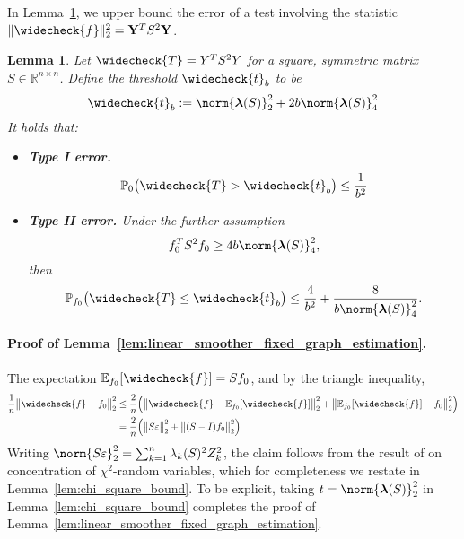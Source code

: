 \documentclass[twoside]{article}
\newcommand{\Reals}{\mathbb{R}}
\newcommand{\1}{\mathbf{1}}
\newcommand{\lambdavec}{\boldsymbol{\lambda}}
\newcommand{\Pbb}{\mathbb{P}}
\newcommand{\Ebb}{\mathbb{E}}
\newcommand{\wc}[1]{\widecheck{#1}}
\newtheorem{lemma}{Lemma}
\theoremstyle{definition}
\theoremstyle{remark}
\begin{document}
In Lemma~\ref{lem:linear_smoother_fixed_graph_testing}, we upper bound the error of a test involving the statistic $\|\wc{f}\|_2^2 = {\bf Y}^T S^2 {\bf Y}$.
\begin{lemma}
	\label{lem:linear_smoother_fixed_graph_testing}
	Let $\wc{T} = Y^T S^2 Y$ for a square, symmetric matrix $S \in \Reals^{n \times n}$. Define the threshold $\wc{t}_b$ to be 
	\begin{equation}
	\wc{t}_{b} := \norm{\lambdavec(S)}_2^2 + 2b \norm{\lambdavec(S)}_4^2
	\end{equation}
	It holds that:
	\begin{itemize}
		\item \textbf{Type I error.}
		\begin{equation}
		\label{eqn:linear_smoother_fixed_graph_testing_typeI}
		\Pbb_0\bigl(\wc{T} > \wc{t}_b\bigr) \leq \frac{1}{b^2}
		\end{equation}
		\item \textbf{Type II error.} Under the further assumption
		\begin{equation}
		\label{eqn:linear_smoother_fixed_graph_testing_critical_radius}
		f_0^T S^2 f_0 \geq 4b \norm{\lambdavec(S)}_4^2,
		\end{equation}
		then
		\begin{equation}
		\label{eqn:linear_smoother_fixed_graph_testing_typeII}
		\Pbb_{f_0}\bigl(\wc{T} \leq \wc{t}_b\bigr) \leq \frac{4}{b^2} + \frac{8}{b \norm{\lambdavec(S)}_4^{2}}.
		\end{equation}
	\end{itemize}
\end{lemma}

\paragraph{Proof of Lemma~\ref{lem:linear_smoother_fixed_graph_estimation}.}
The expectation $\Ebb_{f_0}[\wc{f}] = Sf_0$, and by the triangle inequality,
\begin{align*}
\frac{1}{n}\bigl\|\wc{f} - f_0\bigr\|_2^2 & \leq \frac{2}{n}\Bigl(\bigl\|\wc{f} - \Ebb_{f_0}[\wc{f}]\bigr\|_2^2 + \bigl\|\Ebb_{f_0}[\wc{f}] - f_0\bigr\|_2^2\Bigr) \\ 
& = \frac{2}{n}\Bigl(\bigl\|S\varepsilon\bigr\|_2^2 + \bigl\|(S - I)f_0\bigr\|_2^2\Bigr)
\end{align*}
Writing $\norm{S\varepsilon}_2^2 = \sum_{k = 1}^{n} \lambda_k(S)^2 Z_k^2$, the claim follows from the result of \cite{laurent00} on concentration of $\chi^2$-random variables, which for completeness we restate in Lemma~\ref{lem:chi_square_bound}. To be explicit, taking $t = \norm{\lambdavec(S)}_2^2$ in Lemma~\ref{lem:chi_square_bound} completes the proof of Lemma~\ref{lem:linear_smoother_fixed_graph_estimation}. 
\end{document}
